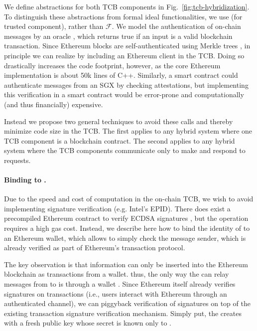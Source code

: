 We define abstractions for both TCB components in Fig.~\ref{fig:tcb-hybridization}.
To distinguish these abstractions from formal ideal functionalities, we use \tcb (for trusted component), rather than $\mathcal{F}$.
We model the authentication of on-chain messages by an oracle \oauth, which returns true if an input is a valid blockchain transaction.
Since Ethereum blocks are self-authenticated using Merkle trees \cite{whitepaper,yellowpaper},
in principle we can realize \oauth by including an Ethereum client in the TCB.
Doing so drastically increases the code footprint, however, as the core Ethereum implementation is about 50k lines of C++.
Similarly, a smart contract could authenticate messages from an SGX by checking attestations,
but implementing this verification in a smart contract would be error-prone and computationally (and thus financially) expensive.

Instead we propose two general techniques to avoid these calls and thereby minimize code size in the TCB.
The first applies to any hybrid system where one TCB component is a blockchain contract.
The second applies to any hybrid system where the TCB components communicate only to make and respond to requests.


\paragraph{Binding \tcboff to \tcadd.}
Due to the speed and cost of computation in the on-chain TCB, we wish to avoid implementing signature verification (e.g. Intel's EPID).
There does exist a precompiled Ethereum contract to verify ECDSA signatures \cite{yellowpaper}, but the operation requires a high gas cost.
Instead, we describe here how to bind the identity of \tcboff to an Ethereum wallet, which allows \tcbon to simply check the message sender,
which is already verified as part of Ethereum's transaction protocol.

The key observation is that information can only be inserted into the Ethereum blockchain as transactions from a wallet.
thus, the only way the \medname can relay messages from \tcboff to \tcbon is through a wallet \tcadd.
Since Ethereum itself already verifies signatures on transactions (i.e., users interact with Ethereum through an authenticated channel),
we can piggyback verification of \tcboff signatures on top of the existing transaction signature verification mechanism.
Simply put, the \tcboff creates \tcadd with a fresh public key \pkoff whose secret is known only to \tcboff.

